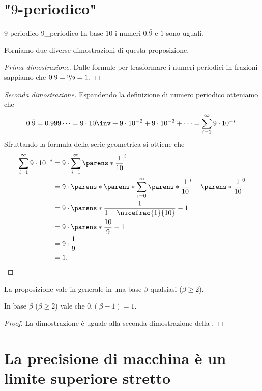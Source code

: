 \section{"$9$-periodico"}

\begin{proposition}
    {$9$-periodico}
    {9_periodico}
    In base $10$ i numeri $0.\bar{9}$ e $1$ sono uguali. 
\end{proposition}
Forniamo due diverse dimostrazioni di questa proposizione.
\begin{proof}
    [Prima dimostrazione]
    Dalle formule per trasformare i numeri periodici in frazioni sappiamo che $0.\bar{9} = \nicefrac{9}{9} = 1$. 
\end{proof}
\begin{proof}
    [Seconda dimostrazione]
    Espandendo la definizione di numero periodico otteniamo che \[
        0.\bar{9} = 0.999\dots = 9\cdot10\inv + 9\cdot10^{-2} + 9\cdot 10^{-3} + \dots = \sum_{i=1}^\infty 9\cdot10^{-i}.
    \] Sfruttando la formula della serie geometrica si ottiene che \begin{align*}
        \sum_{i=1}^\infty 9\cdot10^{-i} &= 9 \cdot \sum_{i=1}^\infty \parens*{\frac{1}{10}}^i\\
        &= 9 \cdot \parens*{\parens*{\sum_{i=0}^\infty \parens*{\frac{1}{10}}^i} - \parens*{\frac{1}{10}}^0}\\
        &= 9 \cdot \parens*{\frac{1}{1-\nicefrac{1}{10}} - 1}\\
        &= 9 \cdot \parens*{\frac{10}{9} - 1}\\
        &= 9 \cdot \frac{1}{9}\\
        &= 1. \qedhere
    \end{align*}
\end{proof}

La proposizione vale in generale in una base $\beta$ qualsiasi ($\beta \geq 2$).
\begin{proposition}{}{}
    In base $\beta$ ($\beta \geq 2$) vale che $0.\overline{(\beta-1)} = 1$.  
\end{proposition}
\begin{proof}
    La dimostrazione è uguale alla seconda dimostrazione della .
\end{proof}

\section{La precisione di macchina è un limite superiore stretto}
\label{sez:machine_prec_>}

